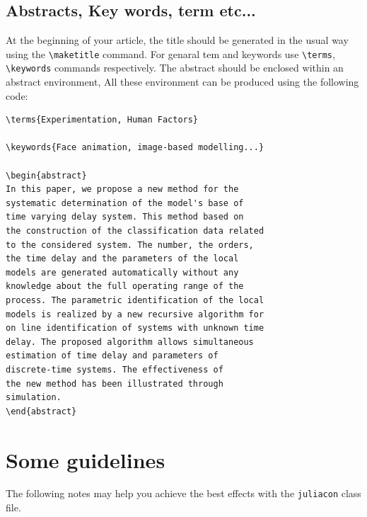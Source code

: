 \documentclass{juliacon}
\begin{document}
\subsection{Abstracts, Key words, term etc...}
\label{subsub:abs_key_etc}

At the beginning of your article, the title should be generated
in the usual way using the \verb|\maketitle|  command. For genaral tem and keywords use
\verb|\terms|,
\verb|\keywords|  commands respectively. The abstract should be enclosed
within an abstract environment, All these environment
can be produced using the following code:
\begin{verbatim}
\terms{Experimentation, Human Factors}

\keywords{Face animation, image-based modelling...}

\begin{abstract}
In this paper, we propose a new method for the
systematic determination of the model's base of
time varying delay system. This method based on
the construction of the classification data related
to the considered system. The number, the orders,
the time delay and the parameters of the local
models are generated automatically without any
knowledge about the full operating range of the
process. The parametric identification of the local
models is realized by a new recursive algorithm for
on line identification of systems with unknown time
delay. The proposed algorithm allows simultaneous
estimation of time delay and parameters of
discrete-time systems. The effectiveness of
the new method has been illustrated through
simulation.
\end{abstract}

\end{verbatim}

\section{Some guidelines}
\label{sec:some_guide}
The following notes may help you achieve the best effects with the
\verb|juliacon|  class file.
\end{document}
